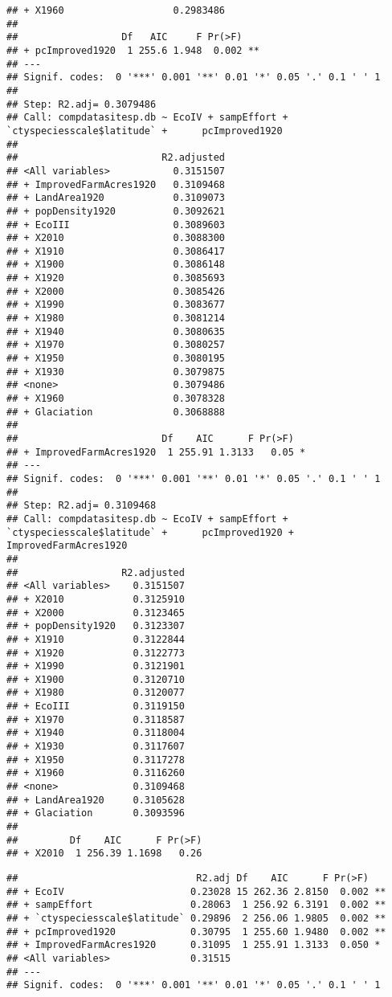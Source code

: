 \documentclass[
]{article}
\newenvironment{Shaded}{\begin{snugshade}}{\end{snugshade}}
\newcommand{\NormalTok}[1]{#1}
\newcommand{\OperatorTok}[1]{\textcolor[rgb]{0.81,0.36,0.00}{\textbf{#1}}}
\begin{document}
\begin{verbatim}
## + X1960                   0.2983486
## 
##                  Df   AIC     F Pr(>F)   
## + pcImproved1920  1 255.6 1.948  0.002 **
## ---
## Signif. codes:  0 '***' 0.001 '**' 0.01 '*' 0.05 '.' 0.1 ' ' 1
## 
## Step: R2.adj= 0.3079486 
## Call: compdatasitesp.db ~ EcoIV + sampEffort + `ctyspeciesscale$latitude` +      pcImproved1920 
##  
##                         R2.adjusted
## <All variables>           0.3151507
## + ImprovedFarmAcres1920   0.3109468
## + LandArea1920            0.3109073
## + popDensity1920          0.3092621
## + EcoIII                  0.3089603
## + X2010                   0.3088300
## + X1910                   0.3086417
## + X1900                   0.3086148
## + X1920                   0.3085693
## + X2000                   0.3085426
## + X1990                   0.3083677
## + X1980                   0.3081214
## + X1940                   0.3080635
## + X1970                   0.3080257
## + X1950                   0.3080195
## + X1930                   0.3079875
## <none>                    0.3079486
## + X1960                   0.3078328
## + Glaciation              0.3068888
## 
##                         Df    AIC      F Pr(>F)  
## + ImprovedFarmAcres1920  1 255.91 1.3133   0.05 *
## ---
## Signif. codes:  0 '***' 0.001 '**' 0.01 '*' 0.05 '.' 0.1 ' ' 1
## 
## Step: R2.adj= 0.3109468 
## Call: compdatasitesp.db ~ EcoIV + sampEffort + `ctyspeciesscale$latitude` +      pcImproved1920 + ImprovedFarmAcres1920 
##  
##                  R2.adjusted
## <All variables>    0.3151507
## + X2010            0.3125910
## + X2000            0.3123465
## + popDensity1920   0.3123307
## + X1910            0.3122844
## + X1920            0.3122773
## + X1990            0.3121901
## + X1900            0.3120710
## + X1980            0.3120077
## + EcoIII           0.3119150
## + X1970            0.3118587
## + X1940            0.3118004
## + X1930            0.3117607
## + X1950            0.3117278
## + X1960            0.3116260
## <none>             0.3109468
## + LandArea1920     0.3105628
## + Glaciation       0.3093596
## 
##         Df    AIC      F Pr(>F)
## + X2010  1 256.39 1.1698   0.26
\end{verbatim}

\begin{Shaded}
\end{Shaded}

\begin{verbatim}
##                               R2.adj Df    AIC      F Pr(>F)   
## + EcoIV                      0.23028 15 262.36 2.8150  0.002 **
## + sampEffort                 0.28063  1 256.92 6.3191  0.002 **
## + `ctyspeciesscale$latitude` 0.29896  2 256.06 1.9805  0.002 **
## + pcImproved1920             0.30795  1 255.60 1.9480  0.002 **
## + ImprovedFarmAcres1920      0.31095  1 255.91 1.3133  0.050 * 
## <All variables>              0.31515                           
## ---
## Signif. codes:  0 '***' 0.001 '**' 0.01 '*' 0.05 '.' 0.1 ' ' 1
\end{verbatim}
\end{document}

